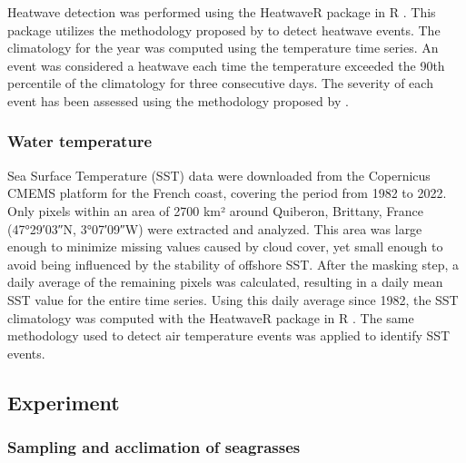 \documentclass[
  number]{elsarticle}
\begin{document}
Heatwave detection was performed using the HeatwaveR package in R
\citep{heatwaveR}. This package utilizes the methodology proposed by
\citep{hobday2016hierarchical} to detect heatwave events. The
climatology for the year was computed using the temperature time series.
An event was considered a heatwave each time the temperature exceeded
the 90th percentile of the climatology for three consecutive days. The
severity of each event has been assessed using the methodology proposed
by \citep{hobday2018categorizing}.

\subsubsection{Water temperature}\label{water-temperature}

Sea Surface Temperature (SST) data were downloaded from the Copernicus
CMEMS platform \citep{CMEMS_1} for the French coast, covering the period
from 1982 to 2022. Only pixels within an area of 2700 km² around
Quiberon, Brittany, France (47°29′03″N, 3°07′09″W) were extracted and
analyzed. This area was large enough to minimize missing values caused
by cloud cover, yet small enough to avoid being influenced by the
stability of offshore SST. After the masking step, a daily average of
the remaining pixels was calculated, resulting in a daily mean SST value
for the entire time series. Using this daily average since 1982, the SST
climatology was computed with the HeatwaveR package in R
\citep{heatwaveR}. The same methodology used to detect air temperature
events was applied to identify SST events.

\subsection{Experiment}\label{experiment}

\subsubsection{Sampling and acclimation of
seagrasses}\label{sampling-and-acclimation-of-seagrasses}
\end{document}
